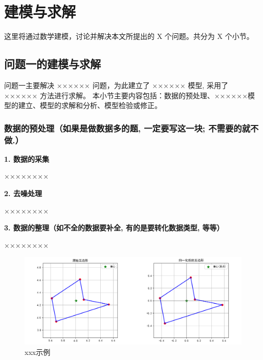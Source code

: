 \section{建模与求解}
这里将通过数学建模，讨论并解决本文所提出的 X 个问题。共分为 X 个小节。

\subsection{问题一的建模与求解}
问题一主要解决 ×××××× 问题，为此建立了 ×××××× 模型, 采用了 ×××××× 方法进行求解。
本小节主要内容包括：数据的预处理、××××××模型的建立、模型的求解和分析、模型检验或修正。

\subsubsection{数据的预处理（如果是做数据多的题, 一定要写这一块; 不需要的就不做.）}
    \textbf{1. 数据的采集}
    
    ××××××××
    
    \textbf{2. 去噪处理}
    
    ××××××××
    
    \textbf{3. 数据的整理（如不全的数据要补全, 有的是要转化数据类型, 等等）}
    
    ××××××××

\begin{figure}[H] %
    \centering      %
    \includegraphics[width=1\textwidth]{figures/pentagon_normalization.png}

    \caption{xxx示例}
    \label{fig:normalize} %
\end{figure}

